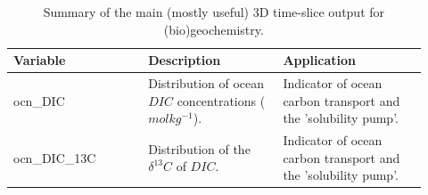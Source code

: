 \begin{table}[ht!]
\begin{tabular}{p{0.30\linewidth} p{0.30\linewidth} p{0.325\linewidth}}
\toprule
\textbf{Variable} & \textbf{Description} & \textbf{Application}\\
\midrule

\textsf{\footnotesize ocn\_DIC} & \small{Distribution of ocean \(DIC\) concentrations (\(molkg^{-1}\)).} & \small{Indicator of ocean carbon transport and the 'solubility pump'.}\\

\textsf{\footnotesize ocn\_DIC\_13C} & \small{Distribution of the \(\delta^{13}C\) of \(DIC\).} & \small{Indicator of ocean carbon transport and the 'solubility pump'.}\\

\bottomrule
\end{tabular}
\caption{Summary of the main (mostly useful) 3D time-slice output for (bio)geochemistry.}
\end{table}

